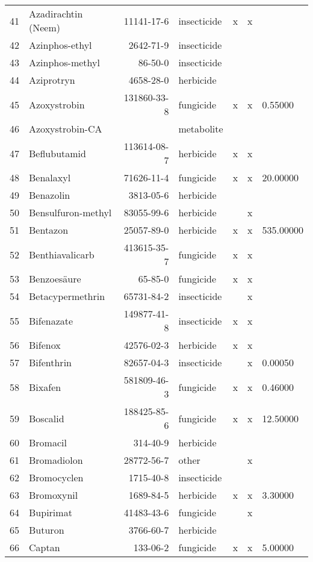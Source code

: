 \begin{longtable}{lp{3cm}rlp{1cm}p{1cm}p{1.5cm}}
  41 & Azadirachtin (Neem) & 11141-17-6 & insecticide & x & x &  \\ 
  42 & Azinphos-ethyl & 2642-71-9 & insecticide &  &  &  \\ 
  43 & Azinphos-methyl & 86-50-0 & insecticide &  &  &  \\ 
  44 & Aziprotryn & 4658-28-0 & herbicide &  &  &  \\ 
  45 & Azoxystrobin & 131860-33-8 & fungicide & x & x & 0.55000 \\ 
  46 & Azoxystrobin-CA &  & metabolite &  &  &  \\ 
  47 & Beflubutamid & 113614-08-7 & herbicide & x & x &  \\ 
  48 & Benalaxyl & 71626-11-4 & fungicide & x & x & 20.00000 \\ 
  49 & Benazolin & 3813-05-6 & herbicide &  &  &  \\ 
  50 & Bensulfuron-methyl & 83055-99-6 & herbicide &  & x &  \\ 
  51 & Bentazon & 25057-89-0 & herbicide & x & x & 535.00000 \\ 
  52 & Benthiavalicarb & 413615-35-7 & fungicide & x & x &  \\ 
  53 & Benzoesäure & 65-85-0 & fungicide & x & x &  \\ 
  54 & Betacypermethrin & 65731-84-2 & insecticide &  & x &  \\ 
  55 & Bifenazate & 149877-41-8 & insecticide & x & x &  \\ 
  56 & Bifenox & 42576-02-3 & herbicide & x & x &  \\ 
  57 & Bifenthrin & 82657-04-3 & insecticide &  & x & 0.00050 \\ 
  58 & Bixafen & 581809-46-3 & fungicide & x & x & 0.46000 \\ 
  59 & Boscalid & 188425-85-6 & fungicide & x & x & 12.50000 \\ 
  60 & Bromacil & 314-40-9 & herbicide &  &  &  \\ 
  61 & Bromadiolon & 28772-56-7 & other &  & x &  \\ 
  62 & Bromocyclen & 1715-40-8 & insecticide &  &  &  \\ 
  63 & Bromoxynil & 1689-84-5 & herbicide & x & x & 3.30000 \\ 
  64 & Bupirimat & 41483-43-6 & fungicide &  & x &  \\ 
  65 & Buturon & 3766-60-7 & herbicide &  &  &  \\ 
  66 & Captan & 133-06-2 & fungicide & x & x & 5.00000 \\ 

\end{longtable}

